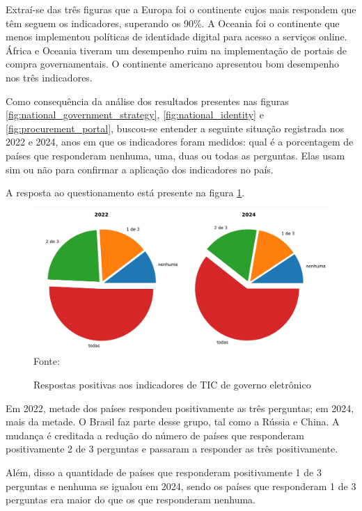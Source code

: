 Extraí-se das três figuras que a Europa foi o continente cujos mais respondem que têm seguem os indicadores, superando os 90\%. A Oceania foi o continente que menos implementou políticas de identidade digital para acesso a serviços online. África e Oceania tiveram um desempenho ruim na implementação de portais de compra governamentais. O continente americano apresentou bom desempenho nos três indicadores.

Como consequência da análise dos resultados presentes nas figuras \ref{fig:national_government_strategy}, \ref{fig:national_identity} e \ref{fig:procurement_portal}, buscou-se entender a seguinte situação registrada nos 2022 e 2024, anos em que os indicadores foram medidos: qual é a porcentagem de países que responderam nenhuma, uma, duas ou todas as perguntas. Elas usam sim ou não para confirmar a aplicação dos indicadores no país.

A resposta ao questionamento está presente na figura \ref{fig:indicators_answer}.

\begin{figure}[H]
	\centering
	\caption{Respostas positivas aos indicadores de TIC de governo eletrônico}
	\includegraphics[width=1\linewidth]{figuras/ict_in_government/indicators_answer}
	\label{fig:indicators_answer}
	\footnotesize{Fonte: \cite{ONU_ICT_in_government_indicators}}
\end{figure}

Em 2022, metade dos países respondeu positivamente as três perguntas; em 2024, mais da metade. O Brasil faz parte desse grupo, tal como a Rússia e China. A mudança é creditada a redução do número de países que responderam positivamente 2 de 3 perguntas e passaram a responder as três positivamente. 

Além, disso a quantidade de países que responderam positivamente 1 de 3 perguntas e nenhuma se igualou em 2024, sendo os países que responderam 1 de 3 perguntas era maior do que os que responderam nenhuma.

